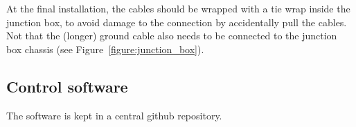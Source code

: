 At the final installation, the cables should be wrapped with a tie wrap inside the junction box, to avoid damage to the connection by accidentally pull the cables. Not that the (longer) ground cable also needs to be connected to the junction box chassis (see Figure~\ref{figure:junction_box}).


\subsection*{Control software}

The software is kept in a central github repository\cite{GITHUB_SOFT}.